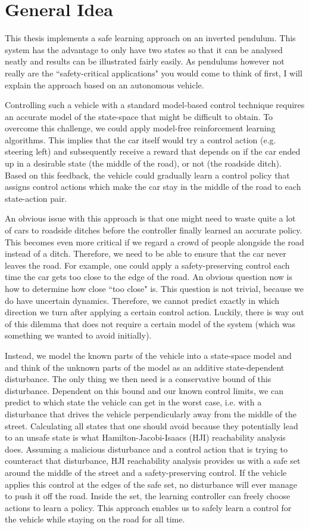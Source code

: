 \documentclass[../main.tex]{subfiles}
\begin{document}
\section{General Idea}
This thesis implements a safe learning approach on an inverted pendulum. This system has the advantage to only have two states so that it can be analysed neatly and results can be illustrated fairly easily. As pendulums however not really are the ``safety-critical applications" you would come to think of first, I will explain the approach based on an autonomous vehicle. \par
Controlling such a vehicle with a standard model-based control technique requires an accurate model of the state-space that might be difficult to obtain. To overcome this challenge, we could apply model-free reinforcement learning algorithms. This implies that the car itself would try a control action (e.g. steering left) and subsequently receive a reward that depends on if the car ended up in a desirable state (the middle of the road), or not (the roadside ditch). Based on this feedback, the vehicle could gradually learn a control policy that assigns control actions which make the car stay in the middle of the road to each state-action pair. \par
An obvious issue with this approach is that one might need to waste quite a lot of cars to roadside ditches before the controller finally learned an accurate policy. This becomes even more critical if we regard a crowd of people alongside the road instead of a ditch. Therefore, we need to be able to ensure that the car never leaves the road. For example, one could apply a safety-preserving control each time the car gets too close to the edge of the road. An obvious question now is how to determine how close ``too close" is. This question is not trivial, because we do have uncertain dynamics. Therefore, we cannot predict exactly in which direction we turn after applying a certain control action. Luckily, there is way out of this dilemma that does not require a certain model of the system (which was something we wanted to avoid initially).\par 
Instead, we model the known parts of the vehicle into a state-space model and and think of the unknown parts of the model as an additive state-dependent disturbance. The only thing we then need is a conservative bound of this disturbance. Dependent on this bound and our known control limits, we can predict to which state the vehicle can get in the worst case, i.e. with a disturbance that drives the vehicle perpendicularly away from the middle of the street. Calculating all states that one should avoid because they potentially lead to an unsafe state is what Hamilton-Jacobi-Isaacs (HJI) reachability analysis does. Assuming a malicious disturbance and a control action that is trying to counteract that disturbance, HJI reachability analysis provides us with a safe set around the middle of the street and a safety-preserving control. If the vehicle applies this control at the edges of the safe set, no disturbance will ever manage to push it off the road. Inside the set, the learning controller can freely choose actions to learn a policy. This approach enables us to safely learn a control for the vehicle while staying on the road for all time. \par 
\end{document}
